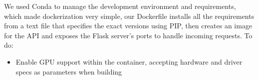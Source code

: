 We used Conda to manage the development environment and requirements, which made dockerization very simple, our Dockerfile installs all the requirements from a text file that specifies the exact versions using PIP, then creates an image for the API and exposes the Flask server's ports to handle incoming requests.
To do:
\begin{itemize}
    \item Enable GPU support within the container, accepting hardware and driver specs as parameters when building
\end{itemize}